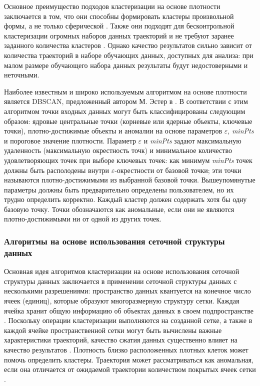 Основное преимущество подходов кластеризации на основе плотности заключается в том, что они способны формировать кластеры произвольной формы, а не только сферической \cite{article:8_review_mot_cl_alg}. Также они подходят для бесконтрольной кластеризации огромных наборов данных траекторий и не требуют заранее заданного количества кластеров \cite{article:5_survey_tbsa}\cite{article:22_survey_dscc}. Однако качество результатов сильно зависит от количества траекторий в наборе обучающих данных, доступных для анализа: при малом размере обучающего набора данных результаты будут недостоверными и неточными.

Наиболее известным и широко используемым алгоритмом на основе плотности является DBSCAN, предложенный автором М. Эстер в \cite{inproceedings:20_dbscan}. В соответствии с этим алгоритмом точки входных данных могут быть классифицированы следующим образом: ядровые центральные точки (корневые или ядерные объекты, ключевые точки), плотно-достижимые объекты и аномалии на основе параметров $\varepsilon$, \textit{minPts} и пороговое значение плотности. Параметр $\varepsilon$ и \textit{minPts} задают максимальную удаленность (максимальную окрестность точк) и минимальное количество удовлетворяющих точек при выборе ключевых точек: как минимум \textit{minPts} точек должны быть располодены внутри $\varepsilon$-окрестности от базовой точки; эти точки называются плотно-достижимыми из выбранной базовой точки. Вышеупомянутые параметры должны быть предварительно определены пользователем, но их трудно определить корректно. Каждый кластер должен содержать хотя бы одну базовую точку. Точки обозначаются как аномальные, если они не являются плотно-достижимыми ни от одной из других точек.

\subsubsection{Алгоритмы на основе использования сеточной структуры данных}

Основная идея алгоритмов кластеризации на основе использования сеточной структуры данных заключается в применении сеточной структуры данных с несколькими разрешениями: пространство данных квантуется на конечное число ячеек (единиц), которые образуют многоразмерную структуру сетки. Каждая ячейка хранит общую информацию об объектах данных в своем подпространстве \cite{article:22_survey_dscc}. Поскольку операции кластеризации выполняются на созданной сетке, а также в каждой ячейке пространственной сетки могут быть вычислены важные характеристики траекторий, качество сжатия данных существенно влияет на качество результатов \cite{article:1_survey_stdm}. Плотность близко расположенных плотных клеток может помочь определить кластеры. Траектория может рассматриваться как аномальная, если она отличается от ожидаемой траектории количеством покрытых ячеек сетки \cite{article:22_survey_dscc}.

